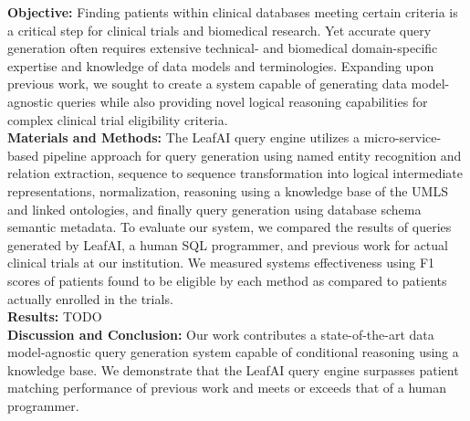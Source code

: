 \documentclass[../main.tex]{subfiles}
\begin{document}
\noindent\textbf{Objective:} Finding patients within clinical databases meeting certain criteria is a critical step for clinical trials and biomedical research. Yet accurate query generation often requires extensive technical- and biomedical domain-specific expertise and knowledge of data models and terminologies. Expanding upon previous work, we sought to create a system capable of generating data model-agnostic queries while also providing novel logical reasoning capabilities for complex clinical trial eligibility criteria. \\

\noindent\textbf{Materials and Methods:} The LeafAI query engine utilizes a micro-service-based pipeline approach for query generation using named entity recognition and relation extraction, sequence to sequence transformation into logical intermediate representations, normalization, reasoning using a knowledge base of the UMLS and linked ontologies, and finally query generation using database schema semantic metadata. To evaluate our system, we compared the results of queries generated by LeafAI, a human SQL programmer, and previous work for actual clinical trials at our institution. We measured systems effectiveness using F1 scores of patients found to be eligible by each method as compared to patients actually enrolled in the trials. \\

\noindent\textbf{Results:} TODO \\

\noindent\textbf{Discussion and Conclusion:} Our work contributes a state-of-the-art data model-agnostic query generation system capable of conditional reasoning using a knowledge base. We demonstrate that the LeafAI query engine surpasses patient matching performance of previous work and meets or exceeds that of a human programmer.
\end{document}
